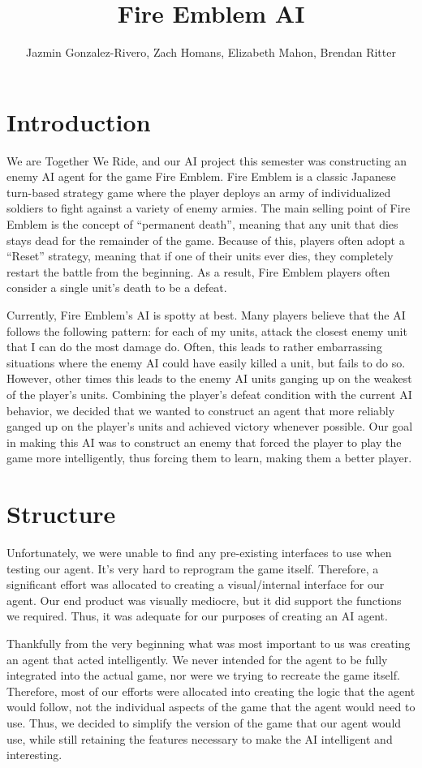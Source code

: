 \documentclass[12pt]{article} %
\title{Fire Emblem AI}
\author{Jazmin Gonzalez-Rivero, Zach Homans, Elizabeth Mahon, Brendan Ritter}
\date{\parbox{\linewidth}{\centering
Artificial Intelligence - Spring 2013\endgraf
  \today}}
\begin{document}
\maketitle

\section{Introduction}
We are Together We Ride, and our AI project this semester was constructing an enemy AI agent for the game Fire Emblem. Fire Emblem is a classic Japanese turn-based strategy game where the player deploys an army of individualized soldiers to fight against a variety of enemy armies. The main selling point of Fire Emblem is the concept of “permanent death”, meaning that any unit that dies stays dead for the remainder of the game. Because of this, players often adopt a “Reset” strategy, meaning that if one of their units ever dies, they completely restart the battle from the beginning. As a result, Fire Emblem players often consider a single unit’s death to be a defeat. 

Currently, Fire Emblem’s AI is spotty at best. Many players believe that the AI follows the following pattern: for each of my units, attack the closest enemy unit that I can do the most damage do. Often, this leads to rather embarrassing situations where the enemy AI could have easily killed a unit, but fails to do so. However, other times this leads to the enemy AI units ganging up on the weakest of the player’s units. Combining the player’s defeat condition with the current AI behavior, we decided that we wanted to construct an agent that more reliably ganged up on the player’s units and achieved victory whenever possible. Our goal in making this AI was to construct an enemy that forced the player to play the game more intelligently, thus forcing them to learn, making them a better player.

\section{Structure}
	Unfortunately, we were unable to find any pre-existing interfaces to use when testing our agent. It’s very hard to reprogram the game itself. Therefore, a significant effort was allocated to creating a visual/internal interface for our agent. Our end product was visually mediocre, but it did support the functions we required. Thus, it was adequate for our purposes of creating an AI agent. 
	
Thankfully from the very beginning what was most important to us was creating an agent that acted intelligently. We never intended for the agent to be fully integrated into the actual game, nor were we trying to recreate the game itself. Therefore, most of our efforts were allocated into creating the logic that the agent would follow, not the individual aspects of the game that the agent would need to use. Thus, we decided to simplify the version of the game that our agent would use, while still retaining the features necessary to make the AI intelligent and interesting. 
\end{document}
